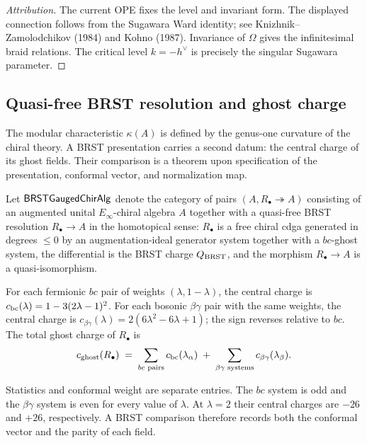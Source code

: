 \begin{proof}[Attribution]
The current OPE fixes the level and invariant form.  The displayed
connection follows from the Sugawara Ward identity; see
Knizhnik--Zamolodchikov (1984) and Kohno (1987).  Invariance of
$\Omega$ gives the infinitesimal braid relations.  The critical level
$k=-h^\vee$ is precisely the singular Sugawara parameter.
\end{proof}

\subsection{Quasi-free BRST resolution and ghost charge}
\label{ssec:climax-platonic-brst}

The modular characteristic $\kappa(A)$ is defined by the genus-one
curvature of the chiral theory.  A BRST presentation carries a second
datum: the central charge of its ghost fields.  Their comparison is a
theorem upon specification of the presentation, conformal vector, and
normalization map.

Let $\mathsf{BRSTGaugedChirAlg}$ denote the category of pairs $(A, R_{\bullet}
\twoheadrightarrow A)$ consisting of an augmented unital $E_\infty$-chiral
algebra $A$ together with a quasi-free BRST resolution
$R_{\bullet} \to A$ in the homotopical sense: $R_{\bullet}$ is a free
chiral cdga generated in degrees $\leq 0$ by an augmentation-ideal
generator system together with a $bc$-ghost system, the
differential is the BRST charge $Q_{\mathrm{BRST}}$, and the morphism
$R_{\bullet} \to A$ is a quasi-isomorphism.

For each fermionic $bc$ pair of weights $(\lambda,1-\lambda)$, the
central charge is
$c_{\mathrm{bc}}(\lambda)=1-3(2\lambda-1)^2$.  For each bosonic
$\beta\gamma$ pair with the same weights, the central charge is
$c_{\beta\gamma}(\lambda)
= 2(6\lambda^{2} - 6\lambda + 1)$; the sign reverses
relative to $bc$. The total ghost charge of $R_{\bullet}$ is
\begin{equation}
\label{eq:c-ghost-formula}
 c_{\mathrm{ghost}}(R_{\bullet})
 \;=\; \sum_{\text{$bc$ pairs}} c_{\mathrm{bc}}(\lambda_{\alpha})
 \;+\; \sum_{\text{$\beta\gamma$ systems}} c_{\beta\gamma}(\lambda_{\beta}).
\end{equation}

\begin{remark}
\label{rem:bc-vs-bg-platonic}
Statistics and conformal weight are separate entries.  The $bc$
system is odd and the $\beta\gamma$ system is even for every value of
$\lambda$.  At $\lambda=2$ their central charges are $-26$ and $+26$,
respectively.  A BRST comparison therefore records both the conformal
vector and the parity of each field.
\end{remark}

